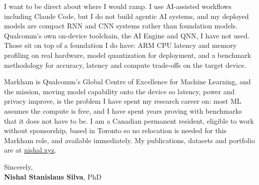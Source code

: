 \documentclass[11pt]{article}
\newcommand{\clName}{Nishal Stanislaus Silva}
\newcommand{\clSite}{https://nishal.xyz}
\begin{document}
I want to be direct about where I would ramp. I use AI-assisted workflows including Claude Code, but I do not build agentic AI systems, and my deployed models are compact RNN and CNN systems rather than foundation models. Qualcomm's own on-device toolchain, the AI Engine and QNN, I have not used. Those sit on top of a foundation I do have: ARM CPU latency and memory profiling on real hardware, model quantization for deployment, and a benchmark methodology for accuracy, latency and compute trade-offs on the target device.

Markham is Qualcomm's Global Centre of Excellence for Machine Learning, and the mission, moving model capability onto the device so latency, power and privacy improve, is the problem I have spent my research career on: most ML assumes the compute is free, and I have spent years proving with benchmarks that it does not have to be. I am a Canadian permanent resident, eligible to work without sponsorship, based in Toronto so no relocation is needed for this Markham role, and available immediately. My publications, datasets and portfolio are at \href{\clSite}{nishal.xyz}.

\vspace{10pt}
Sincerely,\\[2pt]
\textbf{\clName}, PhD
\end{document}
